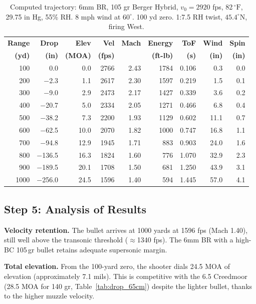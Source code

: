 \documentclass[11pt,twoside,openright]{report}
\newcommand{\degF}{{}^{\circ}\mathrm{F}}
\begin{document}
\begin{table}[H]
\centering
\caption{Computed trajectory: 6mm BR, 105 gr Berger Hybrid, $v_0 = 2920$ fps, 82$\,\degF$, 29.75 in Hg, 55\% RH. 8 mph wind at $60^{\circ}$. 100 yd zero. 1:7.5 RH twist, $45.4^{\circ}$N, firing West.}
\label{tab:6br_trajectory}
\small
\begin{tabular}{@{}rrrrrrrrr@{}}
\toprule
\textbf{Range} & \textbf{Drop} & \textbf{Elev} & \textbf{Vel} & \textbf{Mach} & \textbf{Energy} & \textbf{ToF} & \textbf{Wind} & \textbf{Spin} \\
\textbf{(yd)} & \textbf{(in)} & \textbf{(MOA)} & \textbf{(fps)} & & \textbf{(ft-lb)} & \textbf{(s)} & \textbf{(in)} & \textbf{(in)} \\
\midrule
100  &    0.0 &   0.0 & 2766 & 2.43 & 1784 & 0.106 &   0.3 & 0.0 \\
200  &  $-$2.3 &   1.1 & 2617 & 2.30 & 1597 & 0.219 &   1.5 & 0.1 \\
300  &  $-$9.0 &   2.9 & 2473 & 2.17 & 1427 & 0.339 &   3.6 & 0.2 \\
400  & $-$20.7 &   5.0 & 2334 & 2.05 & 1271 & 0.466 &   6.8 & 0.4 \\
500  & $-$38.2 &   7.3 & 2200 & 1.93 & 1129 & 0.602 &  11.1 & 0.7 \\
600  & $-$62.5 &  10.0 & 2070 & 1.82 & 1000 & 0.747 &  16.8 & 1.1 \\
700  & $-$94.8 &  12.9 & 1945 & 1.71 &  883 & 0.903 &  24.0 & 1.6 \\
800  &$-$136.5 &  16.3 & 1824 & 1.60 &  776 & 1.070 &  32.9 & 2.3 \\
900  &$-$189.5 &  20.1 & 1708 & 1.50 &  681 & 1.250 &  43.9 & 3.1 \\
1000 &$-$256.0 &  24.5 & 1596 & 1.40 &  594 & 1.445 &  57.0 & 4.1 \\
\bottomrule
\end{tabular}
\end{table}

\subsection{Step 5: Analysis of Results}

\textbf{Velocity retention.} The bullet arrives at 1000 yards at 1596 fps (Mach 1.40), still well above the transonic threshold ($\approx$1340 fps). The 6mm BR with a high-BC 105\,gr bullet retains adequate supersonic margin.

\textbf{Total elevation.} From the 100-yard zero, the shooter dials 24.5 MOA of elevation (approximately 7.1 mils). This is competitive with the 6.5 Creedmoor (28.5 MOA for 140 gr, Table~\ref{tab:drop_65cm}) despite the lighter bullet, thanks to the higher muzzle velocity.
\end{document}
